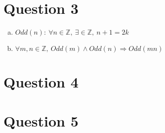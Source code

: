 \documentclass[12pt]{article}
\begin{document}
\section*{Question 3}
\begin{enumerate}[a.]
    \item $Odd(n):\:\forall n \in \mathbb{Z},\:\exists \in \mathbb{Z},\:n+1=2k$
    \item $\forall m,n \in \mathbb{Z},\:Odd(m) \land Odd(n) \Rightarrow Odd(mn)$
\end{enumerate}

\section*{Question 4}

\section*{Question 5}
\end{document}

